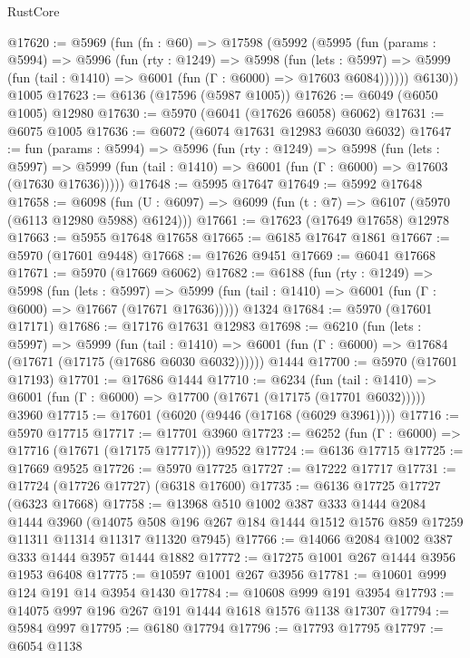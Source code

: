 \begin{lexlean}{RustCore}
\begin{coremodule}
@17620 := @5969
    (fun (fn : @60) =>
    @17598
      (@5992
        (@5995
          (fun (params : @5994) =>
          @5996
            (fun (rty : @1249) =>
            @5998
              (fun (lets : @5997) =>
              @5999 (fun (tail : @1410) => @6001 (fun (Γ : @6000) => @17603 @6084))))))
        @6130))
    @1005
@17623 := @6136 (@17596 (@5987 @1005))
@17626 := @6049 (@6050 @1005) @12980
@17630 := @5970 (@6041 (@17626 @6058) @6062)
@17631 := @6075 @1005
@17636 := @6072 (@6074 @17631 @12983 @6030 @6032)
@17647 := fun (params : @5994) =>
  @5996
    (fun (rty : @1249) =>
    @5998
      (fun (lets : @5997) =>
      @5999 (fun (tail : @1410) => @6001 (fun (Γ : @6000) => @17603 (@17630 @17636)))))
@17648 := @5995 @17647
@17649 := @5992 @17648
@17658 := @6098
    (fun (U : @6097) => @6099 (fun (t : @7) => @6107 (@5970 (@6113 @12980 @5988) @6124)))
@17661 := @17623 (@17649 @17658) @12978
@17663 := @5955 @17648 @17658
@17665 := @6185 @17647 @1861
@17667 := @5970 (@17601 @9448)
@17668 := @17626 @9451
@17669 := @6041 @17668
@17671 := @5970 (@17669 @6062)
@17682 := @6188
    (fun (rty : @1249) =>
    @5998
      (fun (lets : @5997) =>
      @5999 (fun (tail : @1410) => @6001 (fun (Γ : @6000) => @17667 (@17671 @17636)))))
    @1324
@17684 := @5970 (@17601 @17171)
@17686 := @17176 @17631 @12983
@17698 := @6210
    (fun (lets : @5997) =>
    @5999
      (fun (tail : @1410) =>
      @6001 (fun (Γ : @6000) => @17684 (@17671 (@17175 (@17686 @6030 @6032))))))
    @1444
@17700 := @5970 (@17601 @17193)
@17701 := @17686 @1444
@17710 := @6234
    (fun (tail : @1410) => @6001 (fun (Γ : @6000) => @17700 (@17671 (@17175 (@17701 @6032)))))
    @3960
@17715 := @17601 (@6020 (@9446 (@17168 (@6029 @3961))))
@17716 := @5970 @17715
@17717 := @17701 @3960
@17723 := @6252 (fun (Γ : @6000) => @17716 (@17671 (@17175 @17717))) @9522
@17724 := @6136 @17715
@17725 := @17669 @9525
@17726 := @5970 @17725
@17727 := @17222 @17717
@17731 := @17724 (@17726 @17727) (@6318 @17600)
@17735 := @6136 @17725 @17727 (@6323 @17668)
@17758 := @13968
    @510
    @1002
    @387
    @333
    @1444
    @2084
    @1444
    @3960
    (@14075 @508 @196 @267 @184 @1444 @1512 @1576 @859 @17259 @11311 @11314 @11317 @11320 @7945)
@17766 := @14066 @2084 @1002 @387 @333 @1444 @3957 @1444 @1882
@17772 := @17275 @1001 @267 @1444 @3956 @1953 @6408
@17775 := @10597 @1001 @267 @3956
@17781 := @10601 @999 @124 @191 @14 @3954 @1430
@17784 := @10608 @999 @191 @3954
@17793 := @14075 @997 @196 @267 @191 @1444 @1618 @1576 @1138 @17307
@17794 := @5984 @997
@17795 := @6180 @17794
@17796 := @17793 @17795
@17797 := @6054 @1138

\end{coremodule}
\end{lexlean}
